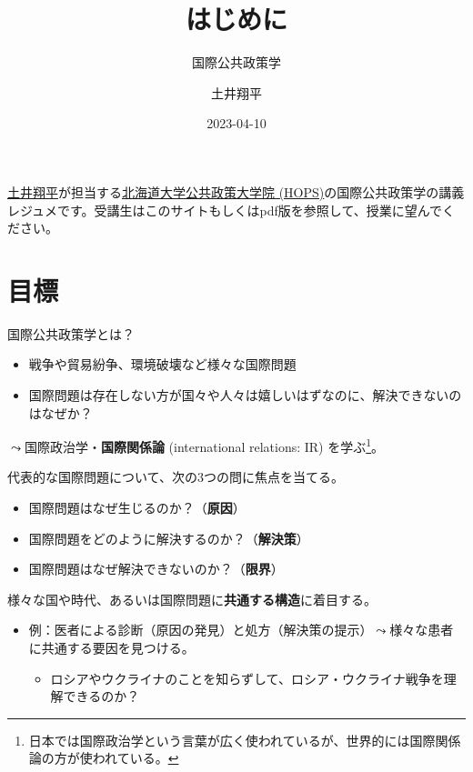 \documentclass[
  xelatex,
  ja=standard]{bxjsarticle}
\title{はじめに}
\subtitle{国際公共政策学}
\author{土井翔平}
\date{2023-04-10}
\providecommand{\tightlist}{%
  \setlength{\itemsep}{0pt}\setlength{\parskip}{0pt}}\usepackage{longtable,booktabs,array}
\begin{document}
\maketitle
\ifdefined\Shaded\renewenvironment{Shaded}{\begin{tcolorbox}[breakable, frame hidden, boxrule=0pt, enhanced, sharp corners, interior hidden, borderline west={3pt}{0pt}{shadecolor}]}{\end{tcolorbox}}\fi

\href{https://shohei-doi.github.io}{土井翔平}が担当する\href{https://www.hops.hokudai.ac.jp/}{北海道大学公共政策大学院
(HOPS)}の国際公共政策学の講義レジュメです。受講生はこのサイトもしくはpdf版を参照して、授業に望んでください。

\hypertarget{ux76eeux6a19}{%
\section{目標}\label{ux76eeux6a19}}

国際公共政策学とは？

\begin{itemize}
\tightlist
\item
  戦争や貿易紛争、環境破壊など様々な国際問題
\item
  国際問題は存在しない方が国々や人々は嬉しいはずなのに、解決できないのはなぜか？
\end{itemize}

\(\leadsto\)国際政治学・\textbf{国際関係論} (international relations:
IR) を学ぶ\footnote{日本では国際政治学という言葉が広く使われているが、世界的には国際関係論の方が使われている。}。

代表的な国際問題について、次の3つの問に焦点を当てる。

\begin{itemize}
\tightlist
\item
  国際問題はなぜ生じるのか？（\textbf{原因}）
\item
  国際問題をどのように解決するのか？（\textbf{解決策}）
\item
  国際問題はなぜ解決できないのか？（\textbf{限界}）
\end{itemize}

様々な国や時代、あるいは国際問題に\textbf{共通する構造}に着目する。

\begin{itemize}
\tightlist
\item
  例：医者による診断（原因の発見）と処方（解決策の提示）\(\leadsto\)様々な患者に共通する要因を見つける。

  \begin{itemize}
  \tightlist
  \item
    ロシアやウクライナのことを知らずして、ロシア・ウクライナ戦争を理解できるのか？
  \end{itemize}
\end{itemize}
\end{document}
